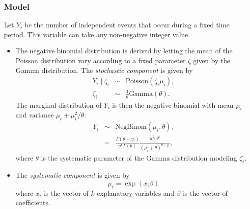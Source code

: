\subsubsection{Model}
Let $Y_i$ be the number of independent events that occur during a
fixed time period. This variable can take any non-negative integer value.

\begin{itemize}
\item The negative binomial distribution is derived by letting the
  mean of the Poisson distribution vary according to a fixed
  parameter $\zeta$ given by the Gamma distribution. The
  \emph{stochastic component} is given by
   \begin{eqnarray*}
     Y_i \mid \zeta_i & \sim & \textrm{Poisson}(\zeta_i \mu_i),\\
     \zeta_i & \sim & \frac{1}{\theta}\textrm{Gamma}(\theta).
   \end{eqnarray*}
   The marginal distribution of $Y_i$ is then the negative binomial
   with mean $\mu_i$ and variance $\mu_i + \mu_i^2/\theta$:
   \begin{eqnarray*}
   Y_i & \sim & \textrm{NegBinom}(\mu_i, \theta), \\
       & = & \frac{\Gamma (\theta + y_i)}{y! \, \Gamma(\theta)} 
             \frac{\mu_i^{y_i} \, \theta^{\theta}}{(\mu_i + \theta)^{\theta + y_i}},
   \end{eqnarray*}
   where $\theta$ is the systematic parameter of the Gamma
   distribution modeling $\zeta_i$.  

 \item The \emph{systematic component} is given by
   \begin{equation*}
     \mu_i = \exp(x_i \beta)
   \end{equation*}
   where $x_i$ is the vector of $k$ explanatory variables and $\beta$ is
   the vector of coefficients.
 \end{itemize}

